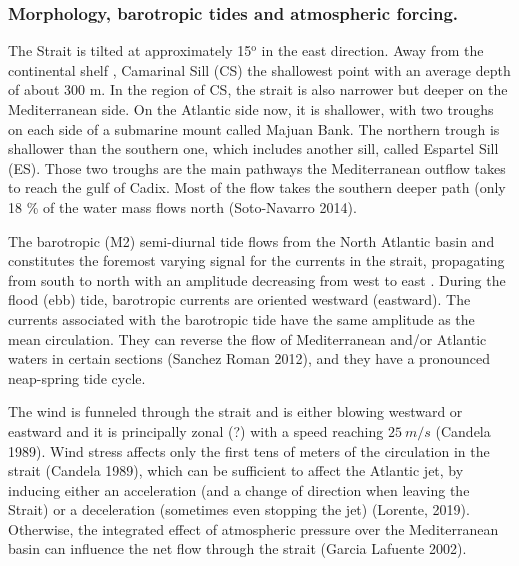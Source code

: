\color{blue}\subsubsection{Morphology, barotropic tides and atmospheric forcing.} \color{black}


The Strait is \color{blue} tilted at approximately \color{black} 15$^\text{o}$ in the east direction. Away from \color{blue}the continental shelf \color{black}, Camarinal Sill (CS) the shallowest point with \color{blue}an average depth of about 300 m. In the region of CS, the strait is also narrower but deeper on the Mediterranean side. \color{black} On the Atlantic side now, it is shallower, with two troughs on each side of a submarine mount called Majuan Bank. The northern trough is shallower than the southern one, which includes another sill, called Espartel Sill (ES). Those two troughs are the main pathways the \color{blue}Mediterranean outflow takes \color{black} to \color{blue} reach \color{black} the gulf of Cadix. Most of the flow takes the southern deeper path \color{blue}(only 18 \% of the water mass flows north (Soto-Navarro 2014)\color{black}.

The barotropic (M2) semi-diurnal tide \color{blue} flows \color{black} from the North Atlantic \color{blue}basin and constitutes \color{black} the foremost varying signal for the currents in the strait, propagating from south to north with an amplitude decreasing from west to east \citep{candela_1990}. During the flood (ebb) tide, barotropic currents are oriented westward (eastward). The currents associated with the barotropic tide \color{blue} have the \color{black} same amplitude as the mean circulation\color{blue}. They \color{black} can reverse the flow of Mediterranean and/or Atlantic waters in certain sections (Sanchez Roman 2012), and they have a pronounced neap-spring tide cycle.

The wind is funneled through the strait and is either \color{blue}blowing westward or eastward and it is \color{black} principally zonal (?) with a speed \color{blue}reaching \color{black} $25\ m/s$ (Candela 1989). Wind stress affects only the first tens of meters of the circulation in the strait (Candela 1989), which can be sufficient to affect the Atlantic jet, by \color{blue}inducing either an acceleration (and a change of direction when leaving the Strait) or a deceleration (sometimes even stopping the jet) \color{black}(Lorente, 2019). Otherwise, the integrated effect of atmospheric pressure over the Mediterranean basin \color{blue} can \color{black} influence the net flow through the strait (Garcia Lafuente 2002).



